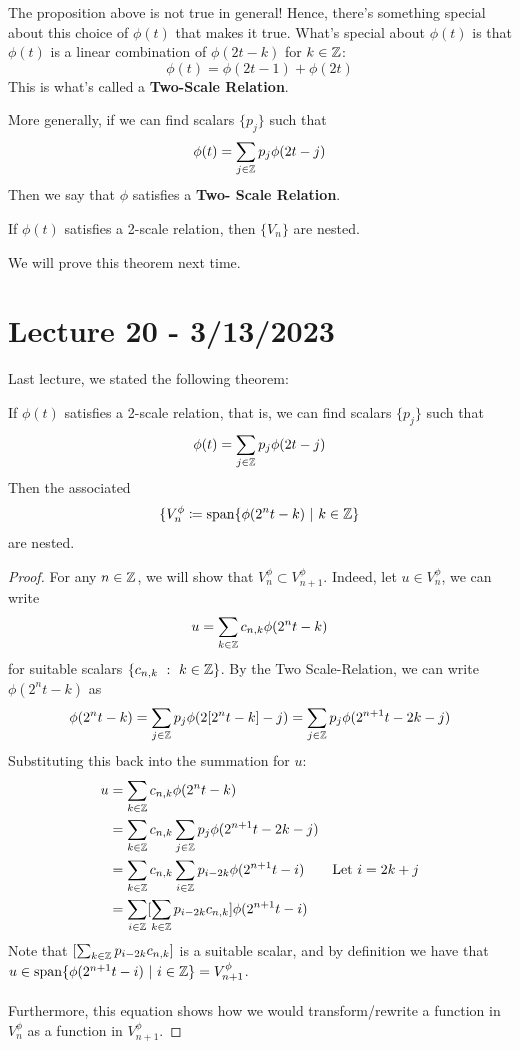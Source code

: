 \documentclass{article}
\begin{document}
The proposition above is not true in general! Hence, there's something special about this choice of $\phi(t)$ that makes it true. What's special about $\phi(t)$ is that $\phi(t)$ is a linear combination of $\phi(2t - k)$ for $k \in \mathbb{Z}$:
    \[\phi(t) = \phi(2t - 1) + \phi(2t)\]
This is what's called a \textbf{Two-Scale Relation}.\\

\begin{definition}
More generally, if we can find scalars $\{ p_j \}$ such that
\[\phi(t) = \sum_{j \in \mathbb{Z}} p_j \phi(2t - j) \]
Then we say that $\phi$ satisfies a \textbf{Two- Scale Relation}.
\end{definition}

\begin{theorem}
    If $\phi(t)$ satisfies a 2-scale relation, then $\{V_n\}$ are nested.
\end{theorem}

We will prove this theorem next time.


\newpage
\section{Lecture 20 - 3/13/2023}

Last lecture, we stated the following theorem:
\begin{theorem}
    If $\phi(t)$ satisfies a 2-scale relation, that is, we can find scalars $\{p_j\}$ such that
    \[\phi(t) = \sum_{j \in \mathbb{Z}} p_j \phi(2t - j)\]
    Then the associated $$\{V_n^\phi \coloneqq \operatorname{span} \{\phi(2^n t - k)\ |\ k \in \mathbb{Z}\}$$ are nested.
\end{theorem}

\begin{proof}
For any $n \in \mathbb{Z}$, we will show that $V_n^\phi \subset V_{n+1}^\phi$. Indeed, let $u \in V_n^\phi$, we can write
\[u = \sum_{k \in \mathbb{Z}} c_{n, k} \phi(2^n t - k) \]
for suitable scalars $\{c_{n, k}\ :\ k \in \mathbb{Z}\}$. By the Two Scale-Relation, we can write $\phi(2^n t - k)$ as
\[\phi(2^n t - k) = \sum_{j \in \mathbb{Z}} p_j \phi(2[2^n t - k] - j) = \sum_{j \in \mathbb{Z}} p_j \phi(2^{n+1} t - 2k - j)\]
Substituting this back into the summation for $u$:
\begin{align*}
    u &= \sum_{k \in \mathbb{Z}} c_{n, k} \phi(2^n t - k)\\
    &= \sum_{k \in \mathbb{Z}} c_{n, k} \sum_{j \in \mathbb{Z}} p_j \phi(2^{n+1} t - 2k - j)\\
    &= \sum_{k \in \mathbb{Z}} c_{n, k} \sum_{i \in \mathbb{Z}} p_{i - 2k} \phi(2^{n+1} t - i) \tag*{Let $i = 2k + j$}\\
    &= \sum_{i \in \mathbb{Z}} [\sum_{k \in \mathbb{Z}} p_{i - 2k} c_{n, k}] \phi(2^{n+1}t - i) 
\end{align*}
Note that $[\sum_{k \in \mathbb{Z}} p_{i - 2k} c_{n, k}]$ is a suitable scalar, and by definition we have that $u \in \operatorname{span} \{\phi(2^{n+1} t - i)\ |\ i \in \mathbb{Z}\} = V_{n+1}^\phi$.\\\\
Furthermore, this equation shows how we would transform/rewrite a function in $V_n^\phi$ as a function in $V_{n+1}^\phi$.
\end{proof}
\end{document}
